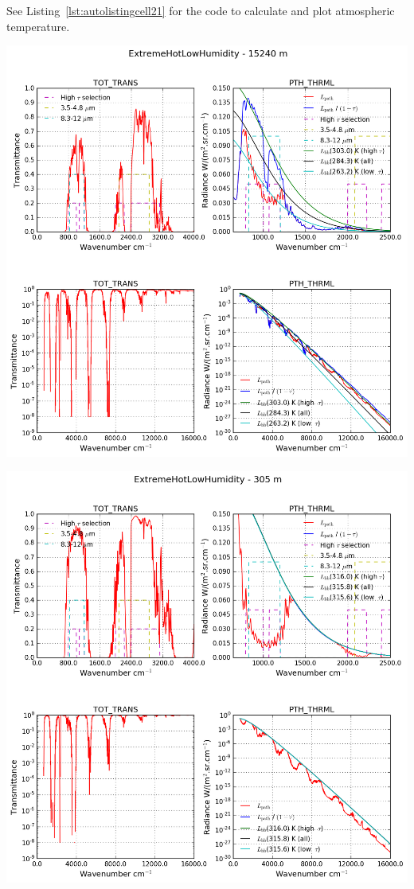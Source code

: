 \documentclass{workpackage}
\begin{document}
See Listing~\ref{lst:autolistingcell21} for the code to calculate and plot atmospheric temperature.

\begin{center}
\includegraphics{./pic/Analyse-Standard-Atmospheres_21_0.png}
\end{center}

\begin{center}
\includegraphics{./pic/Analyse-Standard-Atmospheres_21_1.png}
\end{center}
\end{document}
